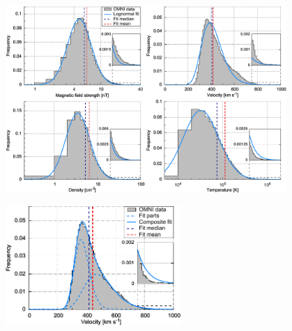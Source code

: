 \documentclass[11pt,aspectratio=1610]{beamer}	%
\newcommand{\captionoftiny}[2]{\captionof{#1}{\color{gray} \tiny #2}}
\begin{document}
\begin{frame}[c]{}{}
	\includegraphics[width=0.8\textwidth]{../figures_paper/histogram_fits_4_a_zoom_paper_pdfplot.pdf}
\end{frame}
\begin{frame}[c]{}{}
	\includegraphics[width=0.5\textwidth]{../figures_paper/histogram_fits_V_a_zoom_dbl_paper_pdfplot.pdf}
\end{frame}
\end{document}
